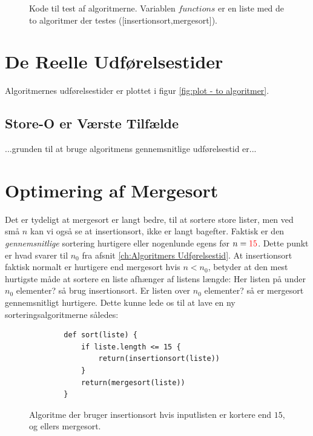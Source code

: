\begin{figure}
	\begin{center}
		
	\end{center}
	\caption{Kode til test af algoritmerne. Variablen $functions$ er en liste med de to algoritmer der testes ([insertionsort,mergesort]).}
	\label{fig:Kode til test af algoritmerne}
\end{figure}



\section{De Reelle Udførelsestider}
\label{sec:De Reelle Køretider}

Algoritmernes udførelsestider er plottet i figur \ref{fig:plot - to algoritmer}.

\subsection{Store-O er Værste Tilfælde}%
\label{sub:Store-O er Værste Tilfælde}

...grunden til at bruge algoritmens gennemsnitlige udførelsestid er...



\section{Optimering af Mergesort}%
\label{sub:Optimering af Mergesort}

Det er tydeligt at mergesort er langt bedre, til at sortere store lister, men ved små $n$ kan vi også se at insertionsort, ikke er langt bagefter. Faktisk er den \emph{gennemsnitlige} sortering hurtigere eller nogenlunde egens før $n = \color{red}15\color{black}$. Dette punkt er hvad svarer til $n_0$ fra afsnit \ref{ch:Algoritmers Udførelsestid}. At insertionsort faktisk normalt er hurtigere end mergesort hvis $n < n_0$, betyder at den mest hurtigste måde at sortere en liste afhænger af listens længde: Her listen på under $n_0$ elementer? så brug insertionsort. Er listen over $n_0$ elementer? så er mergesort gennemsnitligt hurtigere. Dette kunne lede os til at lave en ny sorteringsalgoritmerne således:

\begin{figure}[h]
	\begin{center}
		\begin{lstlisting}
		def sort(liste) {
			if liste.length <= 15 {
				return(insertionsort(liste))
			}
			return(mergesort(liste))
		}
		\end{lstlisting}
	\end{center}
	\vspace{-6mm}
	\caption{Algoritme der bruger insertionsort hvis inputlisten er kortere end $15$, og ellers mergesort.}
	\label{fig:hybridalgoritme1}
\end{figure}


